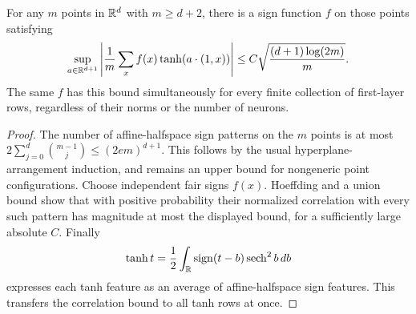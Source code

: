 \begin{lemma}
\label{lem:first-feature-discrepancy}
For any $m$ points in $\mathbb R^d$ with $m\ge d+2$, there is a sign function $f$ on those points satisfying
\[
 \sup_{a\in\mathbb R^{d+1}}
 \left|\frac1m\sum_x f(x)\tanh(a\cdot(1,x))\right|
 \le C\sqrt{\frac{(d+1)\log(2m)}m}.
\]
The same $f$ has this bound simultaneously for every finite collection of first-layer rows, regardless of their norms or the number of neurons.
\end{lemma}
\begin{proof}
The number of affine-halfspace sign patterns on the $m$ points is at most
$2\sum_{j=0}^{d}\binom{m-1}{j}\le(2em)^{d+1}$. This follows by the usual hyperplane-arrangement induction, and remains an upper bound for nongeneric point configurations. Choose independent fair signs $f(x)$. Hoeffding and a union bound show that with positive probability their normalized correlation with every such pattern has magnitude at most the displayed bound, for a sufficiently large absolute $C$.
Finally
\[
 \tanh t=\frac12\int_{\mathbb R}\operatorname{sign}(t-b)
                         \operatorname{sech}^2b\,db
\]
expresses each tanh feature as an average of affine-halfspace sign features. This transfers the correlation bound to all tanh rows at once.
\end{proof}

